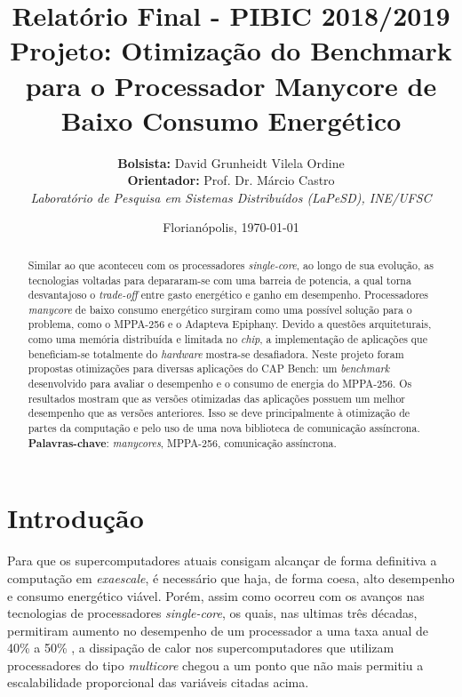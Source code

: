 \documentclass[a4paper,11pt]{article}
\title{\hspace{-0.6cm}\textbf{Relatório Final - PIBIC 2018/2019}\\[0.2cm] \hspace{-0.6cm}\textbf{Projeto:} Otimização do Benchmark \capb para o Processador Manycore de Baixo Consumo Energético \mppa}
\author{\hspace{-0.6cm}\textbf{Bolsista:} David Grunheidt Vilela Ordine\\\hspace{-0.6cm}\textbf{Orientador:} Prof. Dr. Márcio Castro\\ \hspace{-0.6cm}\small{\emph{Laboratório de Pesquisa em Sistemas Distribuídos (LaPeSD), INE/UFSC}}}
\date{\hspace{-0.6cm}\small{Florianópolis, \today}}
\newcommand{\mppa}{MPPA-256\xspace}
\newcommand{\capb}{CAP Bench\xspace}
\newcommand{\epiphany}{Adapteva Epiphany\xspace}
\newcommand{\manycore}{\textit{manycore}\xspace}
\begin{document}
%

\maketitle

\begin{abstract}
Similar ao que aconteceu com os processadores \textit{single-core}, ao longo de sua evolução, as tecnologias voltadas para \hpc depararam-se com uma barreia de potencia, a qual torna desvantajoso o \textit{trade-off} entre gasto energético e ganho em desempenho. Processadores \manycore de baixo consumo energético surgiram como uma possível solução para o problema, como o \mppa e o \epiphany. Devido a questões arquiteturais, como uma memória distribuída e limitada no \textit{chip}, a implementação de aplicações que beneficiam-se totalmente do \textit{hardware} mostra-se desafiadora. Neste projeto foram propostas otimizações para diversas aplicações do \capb: um \textit{benchmark} desenvolvido para avaliar o desempenho e o consumo de energia do \mppa. Os resultados mostram que as versões otimizadas das aplicações possuem um melhor desempenho que as versões anteriores. Isso se deve principalmente à otimização de partes da computação e pelo uso de uma nova biblioteca de comunicação assíncrona. \\

\noindent\textbf{Palavras-chave}: \textit{manycores}, MPPA-256, comunicação assíncrona.
\end{abstract}

\tableofcontents

\newpage

\section{Introdução}


Para que os supercomputadores atuais consigam alcançar de forma definitiva a computação em \textit{exaescale}, é necessário que haja, de forma coesa, alto desempenho e consumo energético viável. Porém, assim como ocorreu com os avanços nas tecnologias de processadores \textit{single-core}, os quais, nas ultimas três décadas, permitiram aumento no desempenho de um processador a uma taxa anual de 40\% a 50\%  \cite{Larus:2008:TM:1364782.1364800}, a dissipação de calor nos supercomputadores que utilizam processadores do tipo \textit{multicore} chegou a um ponto que não mais permitiu a escalabilidade proporcional das variáveis citadas acima.
 
\end{document}
